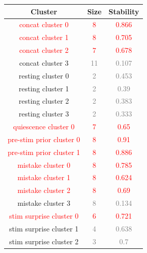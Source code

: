 \begin{table}[ht]
\centering
\renewcommand{\arraystretch}{1.2}
\begin{minipage}{0.48\textwidth}
\begin{tabular}{c|c|c}
\hline
\textbf{Cluster} & \textbf{Size} & \textbf{Stability} \\ \hline
\textcolor{red}{concat cluster 0} & \textcolor{red}{8} & \textcolor{red}{0.866} \\ \hline
\textcolor{red}{concat cluster 1} & \textcolor{red}{8} & \textcolor{red}{0.705} \\ \hline
\textcolor{red}{concat cluster 2} & \textcolor{red}{7} & \textcolor{red}{0.678} \\ \hline
concat cluster 3 & \textcolor{gray}{11} & \textcolor{gray}{0.107} \\ \hline
resting cluster 0 & \textcolor{gray}{2} & \textcolor{gray}{0.453} \\ \hline
resting cluster 1 & \textcolor{gray}{2} & \textcolor{gray}{0.39} \\ \hline
resting cluster 2 & \textcolor{gray}{2} & \textcolor{gray}{0.383} \\ \hline
resting cluster 3 & \textcolor{gray}{2} & \textcolor{gray}{0.333} \\ \hline
\textcolor{red}{quiescence cluster 0} & \textcolor{red}{7} & \textcolor{red}{0.65} \\ \hline
\textcolor{red}{pre-stim prior cluster 0} & \textcolor{red}{8} & \textcolor{red}{0.91} \\ \hline
\textcolor{red}{pre-stim prior cluster 1} & \textcolor{red}{8} & \textcolor{red}{0.886} \\ \hline
\textcolor{red}{mistake cluster 0} & \textcolor{red}{8} & \textcolor{red}{0.785} \\ \hline
\textcolor{red}{mistake cluster 1} & \textcolor{red}{8} & \textcolor{red}{0.624} \\ \hline
\textcolor{red}{mistake cluster 2} & \textcolor{red}{8} & \textcolor{red}{0.69} \\ \hline
mistake cluster 3 & \textcolor{gray}{8} & \textcolor{gray}{0.134} \\ \hline
\textcolor{red}{stim surprise cluster 0} & \textcolor{red}{6} & \textcolor{red}{0.721} \\ \hline
stim surprise cluster 1 & \textcolor{gray}{4} & \textcolor{gray}{0.638} \\ \hline
stim surprise cluster 2 & \textcolor{gray}{3} & \textcolor{gray}{0.7} \\ \hline

\end{tabular}
\end{minipage}
\end{table}
